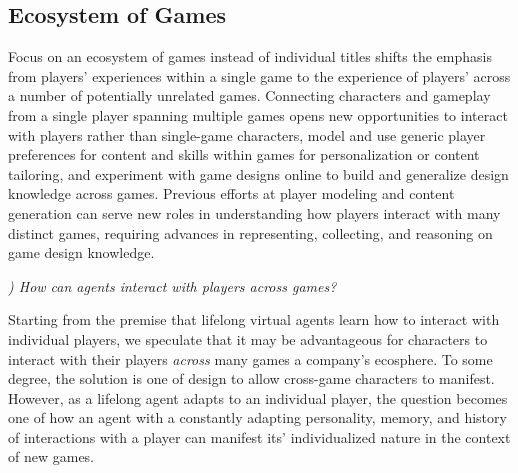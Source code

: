 \documentclass[conference]{IEEEtran}
\newcounter{questionno}
\newcommand{\subsubsectionx}[1]{{\em {\arabic{questionno}) #1}}
	\addtocounter{questionno}{1}
	}
\begin{document}


\subsection{Ecosystem of Games}

Focus on an ecosystem of games instead of individual titles shifts the emphasis from players' experiences within a single game to the experience of players' across a number of potentially unrelated games.
Connecting characters and gameplay from a single player spanning multiple games opens new opportunities to interact with players rather than single-game characters, model and use generic player preferences for content and skills within games for personalization or content tailoring, and experiment with game designs online to build and generalize design knowledge across games. Previous efforts at player modeling and content generation can serve new roles in understanding how players interact with many distinct games, requiring advances in representing, collecting, and reasoning on game design knowledge.

\subsubsectionx{How can agents interact with players across games?}
%
Starting from the premise that lifelong virtual agents learn how to interact with individual players, we speculate that it may be advantageous for characters to interact with their players {\em across} many games a company's ecosphere.
To some degree, the solution is one of design to allow cross-game characters to manifest. 
However, as a lifelong agent adapts to an individual player, the question becomes one of how an agent with a constantly adapting personality, memory, and history of interactions with a player can manifest its' individualized nature in the context of new games.
\end{document}

